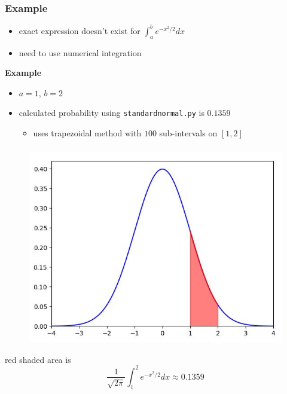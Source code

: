 \documentclass[english,14pt]{beamer}
\begin{document}

\begin{frame}[fragile]

\frametitle{Example}

\begin{itemize}
	\item exact expression doesn't exist for $\int_a^b e^{-x^2/2} dx$
	\item need to use numerical integration
\end{itemize}

\textbf{Example}

\begin{itemize}
	\item $a = 1$, $b = 2$
	\item calculated probability using \texttt{standardnormal.py} is $0.1359$
	\begin{itemize}
		\item uses trapezoidal method with $100$ sub-intervals on $[1,2]$
	\end{itemize}
\end{itemize}

\end{frame}


\begin{frame}[fragile]

\frametitle{}

\begin{figure}[ht]
	\centering
	\includegraphics[width=.7\textwidth]{figures/stdnormal_12}
\end{figure}

red shaded area is
\[
\frac{1}{\sqrt{2\pi}} \int_1^2 e^{-x^2/2} dx \approx 0.1359
\]

\end{frame}
\end{document}
